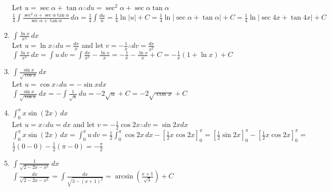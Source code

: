 \documentclass[10pt, letterpaper]{report}
\begin{document}
\begin{enumerate}
    Let $u=\sec{\alpha}+\tan{\alpha}\therefore du=\sec^{2}{\alpha}+\sec{\alpha}\tan{\alpha}$ \\

    $\frac{1}{4}\int{\frac{\sec^{2}{\alpha}+\sec{\alpha}\tan{\alpha}}{\sec{\alpha}+\tan{\alpha}}}\,d\alpha=\frac{1}{4}\int{\frac{du}{u}}=
    \frac{1}{4}\ln{|u|}+C=
    \frac{1}{4}\ln{|\sec{\alpha}+\tan{\alpha}|}+C=
    \frac{1}{4}\ln{|\sec{4x}+\tan{4x}|}+C$ \\

  \item{$\int{\frac{\ln{x}}{x^{2}}}\,dx$} \\

    Let $u=\ln{x}\therefore du=\frac{dx}{x}$ and let $v=-\frac{1}{x}\therefore dv=\frac{dx}{x^{2}}$ \\

    $\int{\frac{\ln{x}}{x^{2}}}\,dx=\int{u}\,dv=
    \int{\frac{dx}{x^{2}}}-\frac{\ln{x}}{x}=
    -\frac{1}{x}-\frac{\ln{x}}{x}+C=
    -\frac{1}{x}\left(1+\ln{x}\right)+C$ \\

  \item{$\int{\frac{\sin{x}}{\sqrt{\cos{x}}}}\,dx$} \\

    Let $u=\cos{x}\therefore du=-\sin{x}dx$ \\

    $\int{\frac{\sin{x}}{\sqrt{\cos{x}}}}\,dx=-\int{\frac{1}{\sqrt{u}}}\,du=
    -2\sqrt{u}+C=-2\sqrt{\cos{x}}+C$ \\
    \pagebreak

  \item{$\int_{0}^{\pi}{x\sin{(2x)}}\,dx$} \\

    Let $u=x\therefore du=dx$ and let $v=-\frac{1}{2}\cos{2x}\therefore dv=\sin{2x}dx$ \\

    $\int_{0}^{\pi}{x\sin{(2x)}}\,dx=\int_{0}^{\pi}{u}\,dv=
    \frac{1}{2}\int_{0}^{\pi}{\cos{2x}}\,dx-[\frac{1}{2}x\cos{2x}]_{0}^{\pi}=
    [\frac{1}{2}\sin{2x}]_{0}^{\pi}-[\frac{1}{2}x\cos{2x}]_{0}^{\pi}=$ \\

    $\frac{1}{2}(0-0)-\frac{1}{2}(\pi-0)=-\frac{\pi}{2}$ \\

  \item{$\int{\frac{1}{\sqrt{2-2x-x^2}}}\,dx$} \\

    $\int{\frac{dx}{\sqrt{2-2x-x^2}}}=\int{\frac{dx}{\sqrt{3-(x+1)^{2}}}}=
    \arcsin{\left(\frac{x+1}{\sqrt{3}}\right)}+C$ \\


\end{enumerate}
\end{document}
